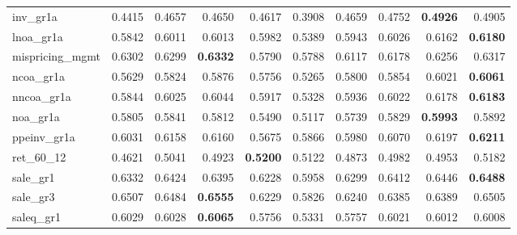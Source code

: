 \begin{longtable}{>{\raggedright\arraybackslash}p{2.6cm}rrrrrrrrr}
inv\_gr1a & 0.4415 & \cellcolor{blue!10}0.4657 & \cellcolor{blue!10}0.4650 & \cellcolor{blue!10}0.4617 & 0.3908 & \cellcolor{blue!10}0.4659 & \cellcolor{blue!10}0.4752 & \textbf{\cellcolor{blue!10}0.4926} & \cellcolor{blue!10}0.4905 \\
lnoa\_gr1a & 0.5842 & \cellcolor{blue!10}0.6011 & \cellcolor{blue!10}0.6013 & \cellcolor{blue!10}0.5982 & 0.5389 & \cellcolor{blue!10}0.5943 & \cellcolor{blue!10}0.6026 & \cellcolor{blue!10}0.6162 & \textbf{\cellcolor{blue!10}0.6180} \\
mispricing\_mgmt & 0.6302 & 0.6299 & \textbf{\cellcolor{blue!10}0.6332} & 0.5790 & 0.5788 & 0.6117 & 0.6178 & 0.6256 & \cellcolor{blue!10}0.6317 \\
ncoa\_gr1a & 0.5629 & \cellcolor{blue!10}0.5824 & \cellcolor{blue!10}0.5876 & \cellcolor{blue!10}0.5756 & 0.5265 & \cellcolor{blue!10}0.5800 & \cellcolor{blue!10}0.5854 & \cellcolor{blue!10}0.6021 & \textbf{\cellcolor{blue!10}0.6061} \\
nncoa\_gr1a & 0.5844 & \cellcolor{blue!10}0.6025 & \cellcolor{blue!10}0.6044 & \cellcolor{blue!10}0.5917 & 0.5328 & \cellcolor{blue!10}0.5936 & \cellcolor{blue!10}0.6022 & \cellcolor{blue!10}0.6178 & \textbf{\cellcolor{blue!10}0.6183} \\
noa\_gr1a & 0.5805 & \cellcolor{blue!10}0.5841 & \cellcolor{blue!10}0.5812 & 0.5490 & 0.5117 & 0.5739 & \cellcolor{blue!10}0.5829 & \textbf{\cellcolor{blue!10}0.5993} & \cellcolor{blue!10}0.5892 \\
ppeinv\_gr1a & 0.6031 & \cellcolor{blue!10}0.6158 & \cellcolor{blue!10}0.6160 & 0.5675 & 0.5866 & 0.5980 & \cellcolor{blue!10}0.6070 & \cellcolor{blue!10}0.6197 & \textbf{\cellcolor{blue!10}0.6211} \\
ret\_60\_12 & 0.4621 & \cellcolor{blue!10}0.5041 & \cellcolor{blue!10}0.4923 & \textbf{\cellcolor{blue!10}0.5200} & \cellcolor{blue!10}0.5122 & \cellcolor{blue!10}0.4873 & \cellcolor{blue!10}0.4982 & \cellcolor{blue!10}0.4953 & \cellcolor{blue!10}0.5182 \\
sale\_gr1 & 0.6332 & \cellcolor{blue!10}0.6424 & \cellcolor{blue!10}0.6395 & 0.6228 & 0.5958 & 0.6299 & \cellcolor{blue!10}0.6412 & \cellcolor{blue!10}0.6446 & \textbf{\cellcolor{blue!10}0.6488} \\
sale\_gr3 & 0.6507 & 0.6484 & \textbf{\cellcolor{blue!10}0.6555} & 0.6229 & 0.5826 & 0.6240 & 0.6385 & 0.6389 & 0.6505 \\
saleq\_gr1 & 0.6029 & 0.6028 & \textbf{\cellcolor{blue!10}0.6065} & 0.5756 & 0.5331 & 0.5757 & 0.6021 & 0.6012 & 0.6008 \\

\end{longtable}
